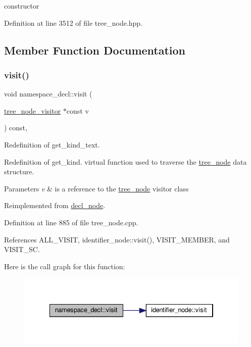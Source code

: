 constructor 



Definition at line 3512 of file tree\+\_\+node.\+hpp.



\subsection{Member Function Documentation}
\mbox{\label{structnamespace__decl_a4870e54b688ed2ab60c49d03c4362ecb}} 
\subsubsection{\texorpdfstring{visit()}{visit()}}
{\footnotesize\ttfamily void namespace\+\_\+decl\+::visit (\begin{DoxyParamCaption}\item[{\hyperlink{classtree__node__visitor}{tree\+\_\+node\+\_\+visitor} $\ast$const}]{v }\end{DoxyParamCaption}) const\hspace{0.3cm}{\ttfamily [override]}, {\ttfamily [virtual]}}



Redefinition of get\+\_\+kind\+\_\+text. 

Redefinition of get\+\_\+kind. virtual function used to traverse the \hyperlink{classtree__node}{tree\+\_\+node} data structure. 
\begin{DoxyParams}{Parameters}
{\em v} & is a reference to the \hyperlink{classtree__node}{tree\+\_\+node} visitor class \\
\hline
\end{DoxyParams}


Reimplemented from \hyperlink{structdecl__node_a9e63331f0c35d9af9d1997afafe9152a}{decl\+\_\+node}.



Definition at line 885 of file tree\+\_\+node.\+cpp.



References A\+L\+L\+\_\+\+V\+I\+S\+IT, identifier\+\_\+node\+::visit(), V\+I\+S\+I\+T\+\_\+\+M\+E\+M\+B\+ER, and V\+I\+S\+I\+T\+\_\+\+SC.

Here is the call graph for this function\+:
\nopagebreak
\begin{figure}[H]
\begin{center}
\leavevmode
\includegraphics[width=334pt]{d4/dca/structnamespace__decl_a4870e54b688ed2ab60c49d03c4362ecb_cgraph}
\end{center}
\end{figure}


